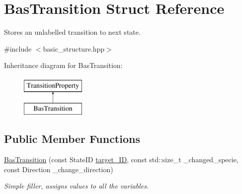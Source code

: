 \hypertarget{structBasTransition}{\section{\-Bas\-Transition \-Struct \-Reference}
\label{structBasTransition}
}


\-Stores an unlabelled transition to next state.  




{\ttfamily \#include $<$basic\-\_\-structure.\-hpp$>$}

\-Inheritance diagram for \-Bas\-Transition\-:\begin{figure}[H]
\begin{center}
\leavevmode
\includegraphics[height=2.000000cm]{structBasTransition}
\end{center}
\end{figure}
\subsection*{\-Public \-Member \-Functions}
\begin{DoxyCompactItemize}
\item 
\hypertarget{structBasTransition_a429dac2adbd7ac5ce7d0c3c6a716d54e}{\hyperlink{structBasTransition_a429dac2adbd7ac5ce7d0c3c6a716d54e}{\-Bas\-Transition} (const \-State\-I\-D \hyperlink{structTransitionProperty_a1e272cf5a26a0db442ac0fed5b797386}{target\-\_\-\-I\-D}, const std\-::size\-\_\-t \-\_\-changed\-\_\-specie, const \-Direction \-\_\-change\-\_\-direction)}\label{structBasTransition_a429dac2adbd7ac5ce7d0c3c6a716d54e}

\begin{DoxyCompactList}\small\item\em \-Simple filler, assigns values to all the variables. \end{DoxyCompactList}\end{DoxyCompactItemize}
